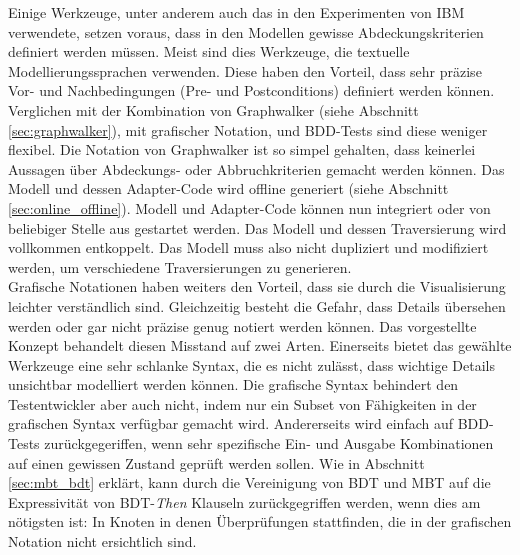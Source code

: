 Einige Werkzeuge, unter anderem auch das in den Experimenten von IBM \cite{farchi_using_2002} verwendete, setzen voraus, dass in den Modellen gewisse Abdeckungskriterien definiert werden müssen. Meist sind dies Werkzeuge, die textuelle Modellierungssprachen verwenden. Diese haben den Vorteil, dass sehr präzise Vor- und Nachbedingungen (Pre- und Postconditions) definiert werden können. Verglichen mit der Kombination von Graphwalker (siehe Abschnitt \ref{sec:graphwalker}), mit grafischer Notation, und BDD-Tests sind diese weniger flexibel. Die Notation von Graphwalker ist so simpel gehalten, dass keinerlei Aussagen über Abdeckungs- oder Abbruchkriterien gemacht werden können. Das Modell und dessen Adapter-Code wird offline generiert (siehe Abschnitt  \ref{sec:online_offline}). Modell und Adapter-Code können nun integriert oder von beliebiger Stelle aus gestartet werden. Das Modell und dessen Traversierung wird vollkommen entkoppelt. Das Modell muss also nicht dupliziert und modifiziert werden, um verschiedene Traversierungen zu generieren.\\
Grafische Notationen haben weiters den Vorteil, dass sie durch die Visualisierung leichter verständlich sind. Gleichzeitig besteht die Gefahr, dass Details übersehen werden oder gar nicht präzise genug notiert werden können. Das vorgestellte Konzept behandelt diesen Misstand auf zwei Arten. Einerseits bietet das gewählte Werkzeuge eine sehr schlanke Syntax, die es nicht zulässt, dass wichtige Details unsichtbar modelliert werden können. Die grafische Syntax behindert den Testentwickler aber auch nicht, indem nur ein Subset von Fähigkeiten in der grafischen Syntax verfügbar gemacht wird. Andererseits wird einfach auf BDD-Tests zurückgegeriffen, wenn sehr spezifische Ein- und Ausgabe Kombinationen auf einen gewissen Zustand geprüft werden sollen. Wie in Abschnitt \ref{sec:mbt_bdt} erklärt, kann durch die Vereinigung von \Gls{BDT} und \Gls{MBT} auf die Expressivität von \Gls{BDT}-\textit{Then} Klauseln zurückgegriffen werden, wenn dies am nötigsten ist: In Knoten in denen Überprüfungen stattfinden, die in der grafischen Notation nicht ersichtlich sind.\\
